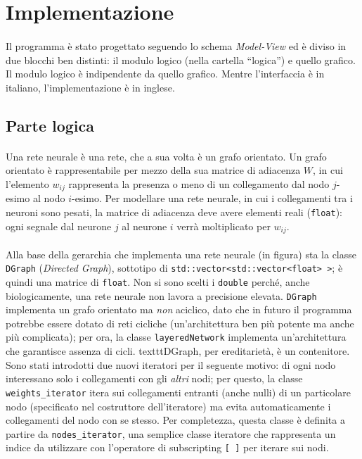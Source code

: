 \documentclass{article}
\begin{document}

\section{Implementazione}

\paragraph{} Il programma è stato progettato seguendo lo schema \textit{Model-View} ed è diviso in due blocchi ben distinti: il modulo logico (nella cartella “logica”) e quello grafico. Il modulo logico è indipendente da quello grafico. Mentre l'interfaccia è in italiano, l'implementazione è in inglese.

\subsection{Parte logica}

\paragraph{} Una rete neurale è una rete, che a sua volta è un grafo orientato. Un grafo orientato è rappresentabile per mezzo della sua matrice di adiacenza $W$, in cui l'elemento $w_{ij}$ rappresenta la presenza o meno di un collegamento dal nodo $j$-esimo al nodo $i$-esimo. Per modellare una rete neurale, in cui i collegamenti tra i neuroni sono pesati, la matrice di adiacenza deve avere elementi reali (\texttt{float}): ogni segnale dal neurone $j$ al neurone $i$ verrà moltiplicato per $w_{ij}$.

\paragraph{} Alla base della gerarchia che implementa una rete neurale (in figura) sta la classe \texttt{DGraph} (\emph{Directed Graph}), sottotipo di \texttt{std::vector<std::vector<float> >}; è quindi una matrice di \texttt{float}. Non si sono scelti i \texttt{double} perché, anche biologicamente, una rete neurale non lavora a precisione elevata. \texttt{DGraph} implementa un grafo orientato ma \emph{non} aciclico, dato che in futuro il programma potrebbe essere dotato di reti cicliche (un'architettura ben più potente ma anche più complicata); per ora, la classe \texttt{layeredNetwork} implementa un'architettura che garantisce assenza di cicli. texttt{DGraph}, per ereditarietà, è un contenitore. Sono stati introdotti due nuovi iteratori per il seguente motivo: di ogni nodo interessano solo i collegamenti con gli \emph{altri} nodi; per questo, la classe \texttt{weights\_iterator} itera sui collegamenti entranti (anche nulli) di un particolare nodo (specificato nel costruttore dell'iteratore) ma evita automaticamente i collegamenti del nodo con se stesso. Per completezza, questa classe è definita a partire da \texttt{nodes\_iterator}, una semplice classe iteratore che rappresenta un indice da utilizzare con l'operatore di subscripting \texttt{[ ]} per iterare sui nodi.
\end{document}
